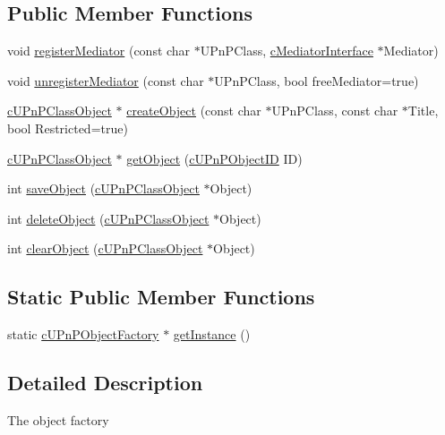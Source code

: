 \subsection*{Public Member Functions}
\begin{CompactItemize}
\item 
void \hyperlink{classcUPnPObjectFactory_f2b20dffcd46c08d5b2de4b6807e0689}{registerMediator} (const char $\ast$UPnPClass, \hyperlink{classcMediatorInterface}{cMediatorInterface} $\ast$Mediator)
\item 
void \hyperlink{classcUPnPObjectFactory_ae48ef32453881a77857bf9772d79d22}{unregisterMediator} (const char $\ast$UPnPClass, bool freeMediator=true)
\item 
\hyperlink{classcUPnPClassObject}{cUPnPClassObject} $\ast$ \hyperlink{classcUPnPObjectFactory_c71bbdb30be6b0fd17f67b8850aeccdb}{createObject} (const char $\ast$UPnPClass, const char $\ast$Title, bool Restricted=true)
\item 
\hyperlink{classcUPnPClassObject}{cUPnPClassObject} $\ast$ \hyperlink{classcUPnPObjectFactory_a26f57549c26c6fc15425158e7fda4b6}{getObject} (\hyperlink{structcUPnPObjectID}{cUPnPObjectID} ID)
\item 
int \hyperlink{classcUPnPObjectFactory_1b521c8cfa3507bec49274b606d5d2c5}{saveObject} (\hyperlink{classcUPnPClassObject}{cUPnPClassObject} $\ast$Object)
\item 
int \hyperlink{classcUPnPObjectFactory_10198e67d9da1f964aa895cd463b2f92}{deleteObject} (\hyperlink{classcUPnPClassObject}{cUPnPClassObject} $\ast$Object)
\item 
int \hyperlink{classcUPnPObjectFactory_947c7256906b4dbe63d156723cdc38be}{clearObject} (\hyperlink{classcUPnPClassObject}{cUPnPClassObject} $\ast$Object)
\end{CompactItemize}
\subsection*{Static Public Member Functions}
\begin{CompactItemize}
\item 
static \hyperlink{classcUPnPObjectFactory}{cUPnPObjectFactory} $\ast$ \hyperlink{classcUPnPObjectFactory_5b99e366dad18ab44ee1d2da5f1c3b4d}{getInstance} ()
\end{CompactItemize}


\subsection{Detailed Description}
The object factory

